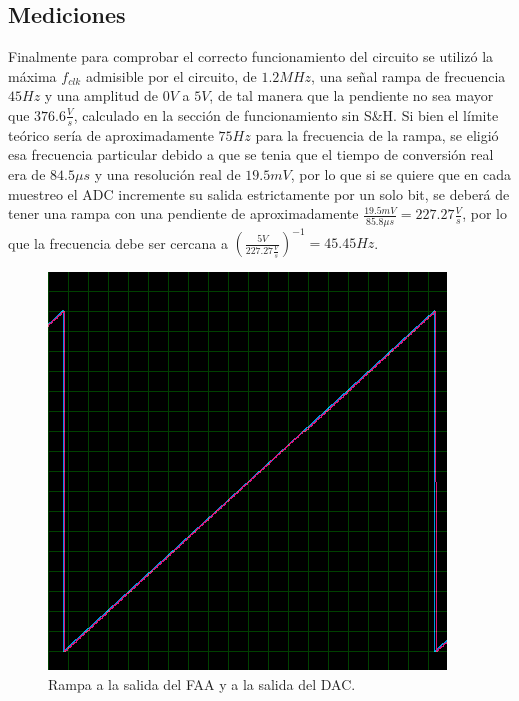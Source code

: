 \subsection{Mediciones}
Finalmente para comprobar el correcto funcionamiento del circuito se utilizó la máxima $f_{clk}$ admisible por el circuito, de $1.2MHz$, una señal rampa de frecuencia $45Hz$ y una amplitud de $0V$ a $5V$, de tal manera que la pendiente no sea mayor que $376.6\frac{V}{s}$, calculado en la sección de funcionamiento sin S\&H. Si bien el límite teórico sería de aproximadamente $75Hz$ para la frecuencia de la rampa, se eligió esa frecuencia particular debido a que se tenia que el tiempo de conversión real era de $84.5\mu s$ y una resolución real de $19.5 mV$, por lo que si se quiere que en cada muestreo el ADC incremente su salida estrictamente por un solo bit, se deberá de tener una rampa con una pendiente de aproximadamente $\frac{19.5mV}{85.8\mu s} = 227.27 \frac{V}{s}$, por lo que la frecuencia debe ser cercana a $\left(\frac{5V}{227.27\frac{V}{s}}\right)^{-1} = 45.45Hz$.

\begin{figure}[H]
\centering
\includegraphics[width=0.8\linewidth]{ImagenesEjercicio1/rampa1.png}
\caption{Rampa a la salida del FAA y a la salida del DAC.}
\label{med1}
\end{figure}

